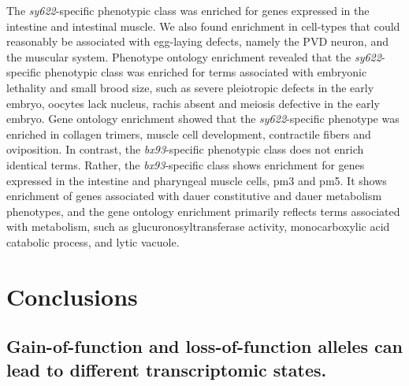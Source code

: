 \documentclass[10pt, onecolumn]{article}
\begin{document}
The \emph{sy622}-specific phenotypic class was enriched for genes expressed in
the intestine and intestinal muscle. We also found enrichment in cell-types that
could reasonably be associated with egg-laying defects, namely the PVD neuron,
and the muscular system. Phenotype ontology enrichment revealed that the
\emph{sy622}-specific phenotypic class was enriched for terms associated with
embryonic lethality and small brood size, such as severe pleiotropic defects in
the early embryo, oocytes lack nucleus, rachis absent and meiosis defective in
the early embryo. Gene ontology enrichment showed that the \emph{sy622}-specific
phenotype was enriched in collagen trimers, muscle cell development, contractile
fibers and oviposition. In contrast, the \emph{bx93}-specific phenotypic class
does not enrich identical terms. Rather, the \emph{bx93}-specific class shows
enrichment for genes expressed in the intestine and pharyngeal muscle cells, pm3
and pm5. It shows enrichment of genes associated with dauer constitutive and
dauer metabolism phenotypes, and the gene ontology enrichment primarily reflects
terms associated with metabolism, such as glucuronosyltransferase activity,
monocarboxylic acid catabolic process, and lytic vacuole.

\section*{Conclusions}
\label{sec:conclusions}
\subsection*{Gain-of-function and loss-of-function alleles can lead to different
             transcriptomic states.}
\label{sec:ras_conclusion}
\end{document}

